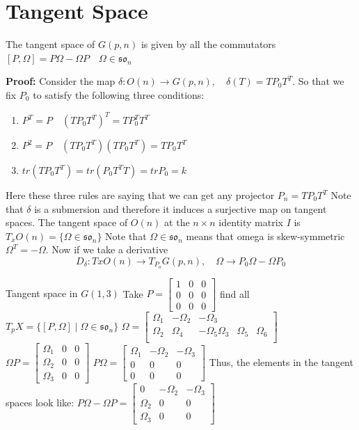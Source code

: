\documentclass[11pt,a4paper]{report}
\begin{document}
\section{Tangent Space}
\begin{Prop}
   The tangent space of $G(p,n)$ is given by all the commutators $ [ P, \Omega] = P \Omega - \Omega P \quad \Omega \in \mathfrak{so}_n  $ 
\end{Prop}
\textbf{Proof:}
Consider the map $\delta: O(n) \to G(p,n), \quad \delta(T) = T P_0 T^T$. So that we fix $P_0$ to satisfy the following three conditions:
\begin{enumerate}
    \item $P^T = P \quad (T P_0 T^T)^T = T P_0^T T^T$
    \item $P^2 = P \quad (T P_0 T^T) (T P_0 T^T) = T P_0 T^T$
    \item $tr(T P_0 T^T) = tr (P_0 T^T T) = tr P_0 = k$
\end{enumerate}
Here these three rules are saying that we can get any projector $P_n = T P_0 T^T$
Note that $\delta$ is a submersion and therefore it induces a surjective map on tangent spaces.
The tangent space of $O(n)$ at the $n \times n$ identity matrix $I$ is
$ T_x O(n) = \{ \Omega \in \mathfrak{so}_n \} $ Note that $\Omega \in \mathfrak{so}_n$ means that omega is skew-symmetric $\Omega^T = -\Omega$.
Now if we take a derivative
$$ D_{\delta} : Tx O(n) \to T_{P_o} G(p,n), \quad \Omega \to P_0 \Omega - \Omega P_0 $$
\begin{Ex}{ Tangent space in $G(1,3)$}
   Take $P = \begin{bmatrix} 1 & 0 & 0 \\ 0 & 0 & 0 \\ 0 & 0 & 0 \end{bmatrix} $
   find all $T_p X = \{ [P,\Omega] \; | \; \Omega \in \mathfrak{so}_n \}$
   $\Omega = \begin{bmatrix} \Omega_1 & -\Omega_2 & -\Omega_3 \\
                             \Omega_2 & \Omega_4 & -\Omega_5
                             \Omega_3 & \Omega_5 & \Omega_6 \\ \end{bmatrix} $
    $\Omega P = \begin{bmatrix} \Omega_1 & 0 & 0 \\ \Omega_2 & 0 & 0 \\ \Omega_3 & 0 & 0 \end{bmatrix}$
    $ P \Omega = \begin{bmatrix} \Omega_1 & -\Omega_2 & - \Omega_3 \\ 0 & 0 & 0 \\ 0 & 0 & 0 \end{bmatrix} $
    Thus, the elements in the tangent spaces look like:
    $ P \Omega - \Omega P  = \begin{bmatrix} 0 & - \Omega_2 & - \Omega_3 \\ \Omega_2 & 0 & 0 \\ \Omega_3 & 0 & 0  \end{bmatrix}$
\end{Ex}
\end{document}

